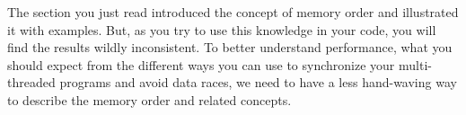 The section you just read introduced the concept of memory order and illustrated it with examples. But, as you try to use this knowledge in your code, you will find the results wildly inconsistent. To better understand performance, what you should expect from the different ways you can use to synchronize your multi-threaded programs and avoid data races, we need to have a less hand-waving way to describe the memory order and related concepts.





































